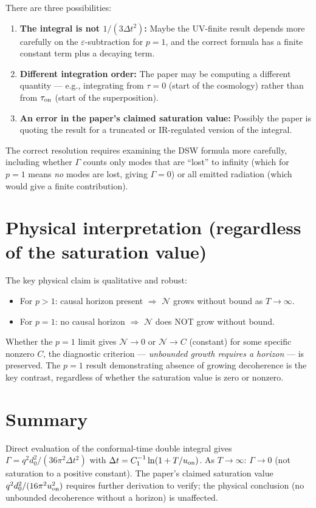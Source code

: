 \documentclass[12pt]{article}
\newcommand{\Nnum}{\mathcal{N}}
\begin{document}
There are three possibilities:
\begin{enumerate}
\item \textbf{The integral is not $1/(3\Delta t^{2})$:} Maybe the UV-finite result
  depends more carefully on the $\varepsilon$-subtraction for $p=1$, and the correct
  formula has a finite constant term plus a decaying term.

\item \textbf{Different integration order:} The paper may be computing a different
  quantity — e.g., integrating from $\tau=0$ (start of the cosmology) rather than
  from $\tau_{\rm on}$ (start of the superposition).

\item \textbf{An error in the paper's claimed saturation value:} Possibly the paper
  is quoting the result for a truncated or IR-regulated version of the integral.
\end{enumerate}

The correct resolution requires examining the DSW formula more carefully, including
whether $\Gamma$ counts only modes that are ``lost'' to infinity (which for $p=1$
means \emph{no} modes are lost, giving $\Gamma=0$) or all emitted radiation
(which would give a finite contribution).

\section*{Physical interpretation (regardless of the saturation value)}

The key physical claim is qualitative and robust:
\begin{itemize}
\item For $p>1$: causal horizon present $\Rightarrow$ $\Nnum$ grows without bound as $T\to\infty$.
\item For $p=1$: no causal horizon $\Rightarrow$ $\Nnum$ does NOT grow without bound.
\end{itemize}

Whether the $p=1$ limit gives $\Nnum\to 0$ or $\Nnum\to C$ (constant) for some
specific nonzero $C$, the diagnostic criterion — \emph{unbounded growth requires a horizon} —
is preserved.  The $p=1$ result demonstrating absence of growing decoherence is
the key contrast, regardless of whether the saturation value is zero or nonzero.

\section*{Summary}

Direct evaluation of the conformal-time double integral gives
$\Gamma = q^{2}d_{0}^{2}/(36\pi^{2}\Delta t^{2})$ with $\Delta t = C_{1}^{-1}\ln(1+T/u_{\rm on})$.
As $T\to\infty$: $\Gamma\to 0$ (not saturation to a positive constant).  The paper's
claimed saturation value $q^{2}d_{0}^{2}/(16\pi^{2}u_{\rm on}^{2})$ requires further
derivation to verify; the physical conclusion (no unbounded decoherence without a horizon)
is unaffected.
\end{document}
